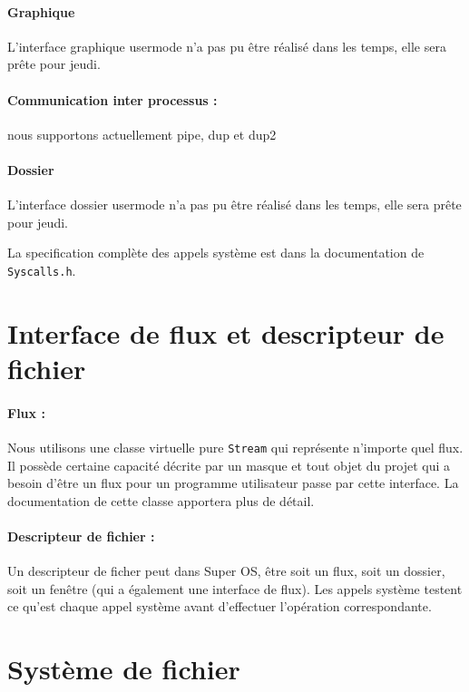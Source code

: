 \documentclass[12pt]{report}
\begin{document}
\paragraph{Graphique} L'interface graphique usermode n'a pas pu être réalisé
dans les temps, elle sera prête pour jeudi.

\paragraph{Communication inter processus :} nous supportons actuellement pipe,
dup et dup2 

\paragraph{Dossier} L'interface dossier usermode n'a pas pu être réalisé
dans les temps, elle sera prête pour jeudi.


La specification complète des appels système est dans la documentation de \verb$Syscalls.h$.

\section{Interface de flux et descripteur de fichier}

\paragraph{Flux :} Nous utilisons une classe virtuelle pure \verb$Stream$ qui représente n'importe
quel flux. Il possède certaine capacité décrite par un masque et tout objet du
projet qui a besoin d'être un flux pour un programme utilisateur passe par cette
interface. La documentation de cette classe apportera plus de détail.

\paragraph{Descripteur de fichier :} Un descripteur de ficher peut dans Super
OS, être soit un flux, soit un dossier, soit un fenêtre (qui a également une
interface de flux). Les appels système testent ce qu'est chaque appel système
avant d'effectuer l'opération correspondante.




\section{Système de fichier}
\end{document}
